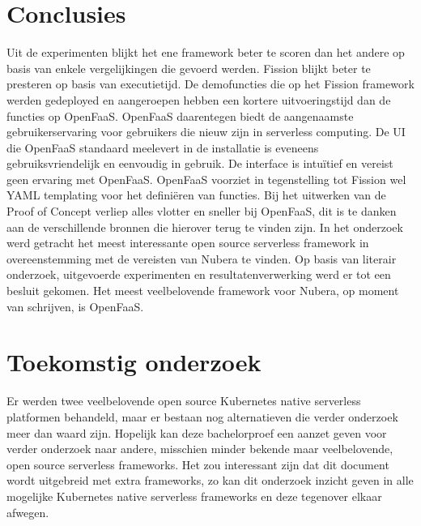\documentclass[a0,portrait]{a0poster}
\begin{document}
\begin{multicols}{2}



\color{HoGentAccent1} 
\section*{Conclusies}
\color{black}
Uit de experimenten blijkt het ene framework beter te scoren dan het andere op basis van enkele vergelijkingen die gevoerd werden. Fission blijkt beter te presteren op basis van executietijd. De demofuncties die op het Fission framework werden gedeployed en aangeroepen hebben een kortere uitvoeringstijd dan de functies op OpenFaaS. OpenFaaS daarentegen biedt de aangenaamste gebruikerservaring voor gebruikers die nieuw zijn in serverless computing. De UI die OpenFaaS standaard meelevert in de installatie is eveneens gebruiksvriendelijk en eenvoudig in gebruik. De interface is intuïtief en vereist geen ervaring met OpenFaaS. OpenFaaS voorziet in tegenstelling tot Fission wel YAML templating voor het definiëren van functies. Bij het uitwerken van de Proof of Concept verliep alles vlotter en sneller bij OpenFaaS, dit is te danken aan de verschillende bronnen die hierover terug te vinden zijn. In het onderzoek werd getracht het meest interessante open source serverless framework in overeenstemming met de vereisten van Nubera te vinden. Op basis van literair onderzoek, uitgevoerde experimenten en resultatenverwerking werd er tot een besluit gekomen. Het meest veelbelovende framework voor Nubera, op moment van schrijven, is OpenFaaS.

\color{HoGentAccent1} 
\section*{Toekomstig onderzoek}
\color{black}
Er werden twee veelbelovende open source Kubernetes native serverless platformen behandeld, maar er bestaan nog alternatieven die verder onderzoek meer dan waard zijn. Hopelijk kan deze bachelorproef een aanzet geven voor verder onderzoek naar andere, misschien minder bekende maar veelbelovende, open source serverless frameworks. Het zou interessant zijn dat dit document wordt uitgebreid met extra frameworks, zo kan dit onderzoek inzicht geven in alle mogelijke Kubernetes native serverless frameworks en deze tegenover elkaar afwegen.
\end{multicols}
\end{document}
